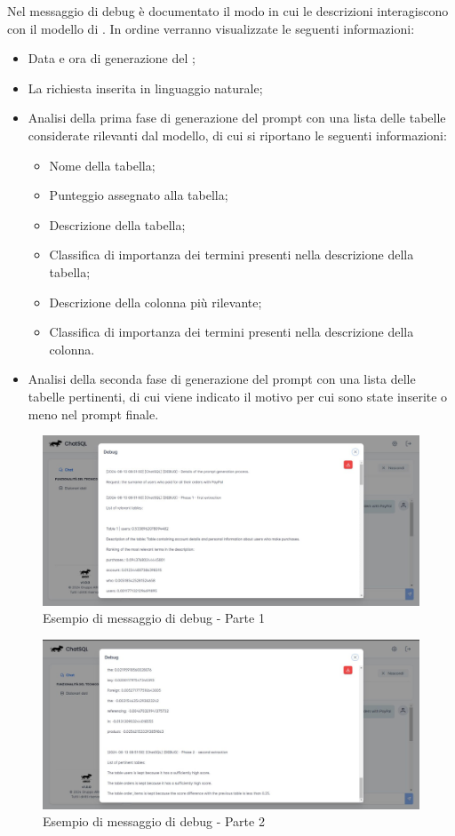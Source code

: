 \par Nel messaggio di debug è documentato il modo in cui le descrizioni interagiscono con il modello di . In ordine verranno visualizzate le seguenti informazioni: 
\begin{itemize}
  \item Data e ora di generazione del ; 
  \item La richiesta inserita in linguaggio naturale;
  \item Analisi della prima fase di generazione del prompt con una lista delle tabelle considerate rilevanti dal modello, di cui si riportano le seguenti informazioni:
  \begin{itemize}
    \item Nome della tabella;
    \item Punteggio assegnato alla tabella;
    \item Descrizione della tabella;
    \item Classifica di importanza dei termini presenti nella descrizione della tabella;
    \item Descrizione della colonna più rilevante;
    \item Classifica di importanza dei termini presenti nella descrizione della colonna.
  \end{itemize}
  \item Analisi della seconda fase di generazione del prompt con una lista delle tabelle pertinenti, di cui viene indicato il motivo per cui sono state inserite o meno nel prompt finale.
\end{itemize}
\begin{figure}[H]
  \centering
  \includegraphics[width=\textwidth]{assets/analisi_debug1.jpg}
  \caption{Esempio di messaggio di debug - Parte 1}
\end{figure}

\begin{figure}[H]
  \centering
  \includegraphics[width=\textwidth]{assets/analisi_debug2.jpg}
  \caption{Esempio di messaggio di debug - Parte 2}
\end{figure}


